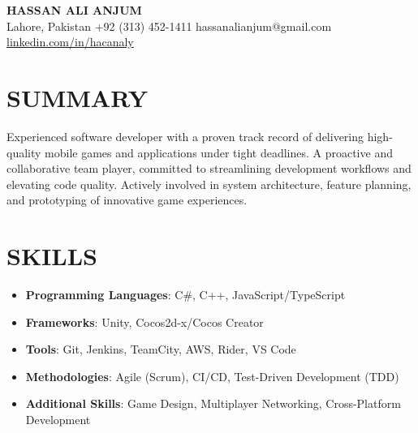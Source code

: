\documentclass[11pt]{article}
\begin{document}
\begin{center}
    {\LARGE\textbf{HASSAN ALI ANJUM}} \\
    \vspace{5pt}
    Lahore, Pakistan \textbullet{} +92 (313) 452-1411 \textbullet{} hassanalianjum@gmail.com \textbullet{} \href{https://linkedin.com/in/hacanaly}{linkedin.com/in/hacanaly}
\end{center}

\section*{SUMMARY}
Experienced software developer with a proven track record of delivering high-quality mobile games and applications under tight deadlines. A proactive and collaborative team player, committed to streamlining development workflows and elevating code quality. Actively involved in system architecture, feature planning, and prototyping of innovative game experiences.

\section*{SKILLS}
\begin{itemize}
    \item \textbf{Programming Languages}: C\#, C++, JavaScript/TypeScript
    \item \textbf{Frameworks}: Unity, Cocos2d-x/Cocos Creator
    \item \textbf{Tools}: Git, Jenkins, TeamCity, AWS, Rider, VS Code
    \item \textbf{Methodologies}: Agile (Scrum), CI/CD, Test-Driven Development (TDD)
    \item \textbf{Additional Skills}: Game Design, Multiplayer Networking, Cross-Platform Development
\end{itemize}

\end{document}
